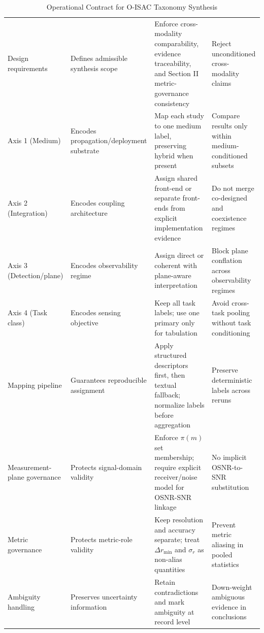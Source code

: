 \begin{table}[htbp]
\caption{Operational Contract for O-ISAC Taxonomy Synthesis}
\label{tab:taxonomy_contract}
\centering
\setlength{\tabcolsep}{4pt}
\renewcommand{\arraystretch}{1.12}
\begin{tabularx}{\textwidth}{@{}L{2.4cm}Y Y Y@{}}
\toprule
{} &  &  &  \\
\midrule
Design requirements & Defines admissible synthesis scope & Enforce cross-modality comparability, evidence traceability, and Section II metric-governance consistency & Reject unconditioned cross-modality claims \\
Axis 1 (Medium) & Encodes propagation/deployment substrate & Map each study to one medium label, preserving hybrid when present & Compare results only within medium-conditioned subsets \\
Axis 2 (Integration) & Encodes coupling architecture & Assign shared front-end or separate front-ends from explicit implementation evidence & Do not merge co-designed and coexistence regimes \\
Axis 3 (Detection/plane) & Encodes observability regime & Assign direct or coherent with plane-aware interpretation & Block plane conflation across observability regimes \\
Axis 4 (Task class) & Encodes sensing objective & Keep all task labels; use one primary only for tabulation & Avoid cross-task pooling without task conditioning \\
Mapping pipeline & Guarantees reproducible assignment & Apply structured descriptors first, then textual fallback; normalize labels before aggregation & Preserve deterministic labels across reruns \\
Measurement-plane governance & Protects signal-domain validity & Enforce $\pi(m)$ set membership; require explicit receiver/noise model for OSNR-SNR linkage & No implicit OSNR-to-SNR substitution \\
Metric governance & Protects metric-role validity & Keep resolution and accuracy separate; treat $\Delta r_{\min}$ and $\sigma_r$ as non-alias quantities & Prevent metric aliasing in pooled statistics \\
Ambiguity handling & Preserves uncertainty information & Retain contradictions and mark ambiguity at record level & Down-weight ambiguous evidence in conclusions \\
\bottomrule
\end{tabularx}
\end{table}

